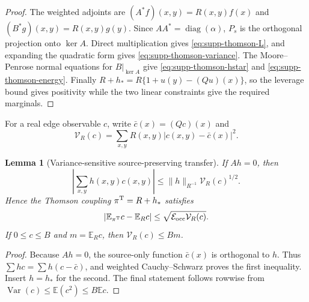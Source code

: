 \documentclass[11pt]{article}
\numberwithin{equation}{section}
\newtheorem{lemma}[lemma]{Lemma}
\theoremstyle{definition}
\theoremstyle{remark}
\newcommand{\diag}{\operatorname{diag}}
\begin{document}
\begin{proof}
The weighted adjoints are
$(A^*f)(x,y)=R(x,y)f(x)$ and
$(B^*g)(x,y)=R(x,y)g(y)$.  Since $AA^*=\diag(\alpha)$,
$P_s$ is the orthogonal projection onto $\ker A$.  Direct multiplication
gives \eqref{eq:supp-thomson-L}, and expanding the quadratic form gives
\eqref{eq:supp-thomson-variance}.  The Moore--Penrose normal equations for
$B|_{\ker A}$ give \eqref{eq:supp-thomson-hstar} and
\eqref{eq:supp-thomson-energy}.  Finally
$R+h_*=R\{1+u(y)-(Qu)(x)\}$, so the leverage bound gives positivity while
the two linear constraints give the required marginals.
\end{proof}

For a real edge observable $c$, write
$\bar c(x)=(Qc)(x)$ and
\begin{equation}
 \mathcal V_R(c)=\sum_{x,y}R(x,y)|c(x,y)-\bar c(x)|^2.
 \label{eq:supp-same-cylinder-variance}
\end{equation}

\begin{lemma}[Variance-sensitive source-preserving transfer]
\label{lem:supp-same-cylinder-transfer}
If $Ah=0$, then
\begin{equation}
 \left|\sum_{x,y}h(x,y)c(x,y)\right|
 \le\|h\|_{R^{-1}}\mathcal V_R(c)^{1/2}.
 \label{eq:supp-same-cylinder-transfer}
\end{equation}
Hence the Thomson coupling $\pi^{\rm T}=R+h_*$ satisfies
\begin{equation}
 |\mathbb E_{\pi^{\rm T}}c-\mathbb E_Rc|
 \le\sqrt{\mathcal E_{\rm occ}\mathcal V_R(c)}.
 \label{eq:supp-same-cylinder-transfer-thomson}
\end{equation}
If $0\le c\le B$ and $m=\mathbb E_Rc$, then
$\mathcal V_R(c)\le Bm$.
\end{lemma}
\begin{proof}
Because $Ah=0$, the source-only function $\bar c(x)$ is orthogonal to $h$.
Thus $\sum hc=\sum h(c-\bar c)$, and weighted Cauchy--Schwarz proves the
first inequality.  Insert $h=h_*$ for the second.  The final statement
follows rowwise from $\operatorname{Var}(c)\le\mathbb E(c^2)\le B\mathbb Ec$.
\end{proof}
\end{document}
